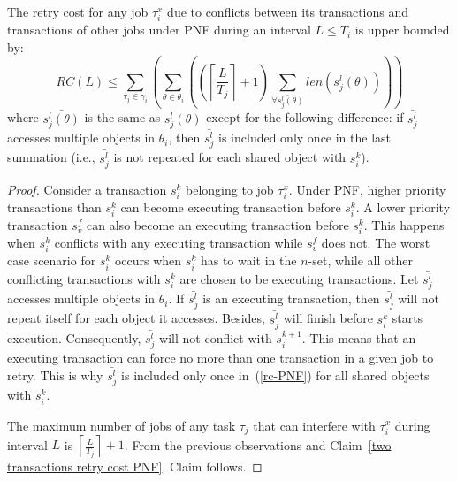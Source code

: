 \begin{clm}
The retry cost for any job $\tau_{i}^{x}$ due to conflicts between its transactions and transactions of other jobs under PNF during an interval $L\le T_{i}$ is upper bounded by:
\begin{equation}
RC(L)\le\sum_{\tau_{j}\in\gamma_{i}}\left(\sum_{\theta\in\theta_{i}}\left(\left(\left\lceil \frac{L}{T_{j}}\right\rceil +1\right)\sum_{\bar{\forall s_{j}^{l}(\theta)}}len\left(\bar{s_{j}^{l}(\theta)}\right)\right)\right)\label{rc-PNF}
\end{equation}
where $\bar{s_{j}^{l}(\theta)}$ is the same as $s_{j}^{l}(\theta)$ except for the following difference:
 if $\bar{s_{j}^{l}}$ accesses multiple objects in $\theta_{i}$,
then $\bar{s_{j}^{l}}$ is included only once in the last summation (i.e., $\bar{s_j^l}$ is not repeated for each shared object with $s_i^k$).
\end{clm}
\begin{proof}\normalfont
Consider a transaction $s_{i}^{k}$ belonging to job $\tau_{i}^{x}$. Under PNF, higher priority transactions than $s_i^k$ can become executing transaction before $s_i^k$. A lower priority transaction $s_v^f$ can also become an executing transaction before $s_i^k$. This happens when $s_i^k$ conflicts with any executing transaction while $s_v^f$ does not. The worst case scenario for $s_{i}^{k}$ occurs when $s_i^k$ has to wait in the $n$-set, while all other conflicting transactions with $s_i^k$ are chosen to be executing transactions. 
Let $\bar{s_j^l}$ accesses multiple objects in $\theta_i$. If $\bar{s_j^l}$ is an executing transaction, then $\bar{s_j^l}$ will not repeat itself for each object it accesses. Besides, $\bar{s_j^l}$ will finish before $s_i^k$ starts execution. Consequently, $\bar{s_j^l}$ will not conflict with $s_i^{k+1}$. This means that an executing transaction can force no more than one transaction in a given job to retry. This is why $\bar{s_j^l}$ is included only once in~(\ref{rc-PNF}) for all shared objects with $s_i^k$.

The maximum number of jobs of any task $\tau_{j}$ that can interfere with $\tau_{i}^{x}$ during interval $L$ is $\left\lceil \frac{L}{T_{j}}\right\rceil +1$. From  the previous observations and Claim~\ref{two transactions retry cost PNF}, Claim follows.
\end{proof}

